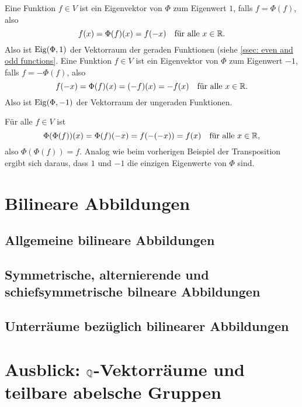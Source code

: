 \begin{bsp}
\begin{enumerate}
   Eine Funktion $f \in V$ ist ein Eigenvektor von $\Phi$ zum Eigenwert $1$, falls $f = \Phi(f)$, also
   \[
    f(x) = \Phi(f)(x) = f(-x)
    \quad
    \text{für alle $x \in \mathbb{R}$}.
   \]
   Also ist $\mathrm{Eig}(\Phi, 1)$ der Vektorraum der geraden Funktionen (siehe \ref{ssec: even and odd functions}. Eine Funktion $f \in V$ ist ein Eigenvektor von $\Phi$ zum Eigenwert $-1$, falls $f = -\Phi(f)$, also
   \[
    f(-x) = \Phi(f)(x) = (-f)(x) = -f(x)
    \quad
    \text{für alle $x \in \mathbb{R}$}.
   \]
   Also ist $\mathrm{Eig}(\Phi, -1)$ der Vektorraum der ungeraden Funktionen.
   
   Für alle $f \in V$ ist
   \[
    \Phi(\Phi(f))(x)
    = \Phi(f)(-x)
    = f(-(-x))
    = f(x)
    \quad
    \text{für alle $x \in \mathbb{R}$},
   \]
   also $\Phi(\Phi(f)) = f$. Analog wie beim vorherigen Beispiel der Transposition ergibt sich daraus, dass $1$ und $-1$ die einzigen Eigenwerte von $\Phi$ sind.
 \end{enumerate}
\end{bsp}





\section{Bilineare Abbildungen}


\subsection{Allgemeine bilineare Abbildungen}


\subsection{Symmetrische, alternierende und schiefsymmetrische bilneare Abbildungen}


\subsection{Unterräume bezüglich bilinearer Abbildungen}




\section{Ausblick: \texorpdfstring{$\mathbb{Q}$}{Q}-Vektorräume und teilbare abelsche Gruppen}




